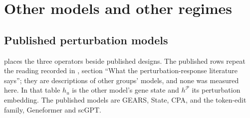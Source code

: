 
\section{Other models and other regimes}
\label{sec:context}

\subsection{Published perturbation models}

 places the three operators beside published designs. The published
rows repeat the reading recorded in , section
``What the perturbation-response literature says''; they are descriptions of other
groups' models, and none was measured here. In that table $h_u$ is the other model's gene
state and $h^{\mathcal P}$ its perturbation embedding. The published models are
GEARS,
State,
CPA, and the token-edit family, Geneformer and
scGPT.

